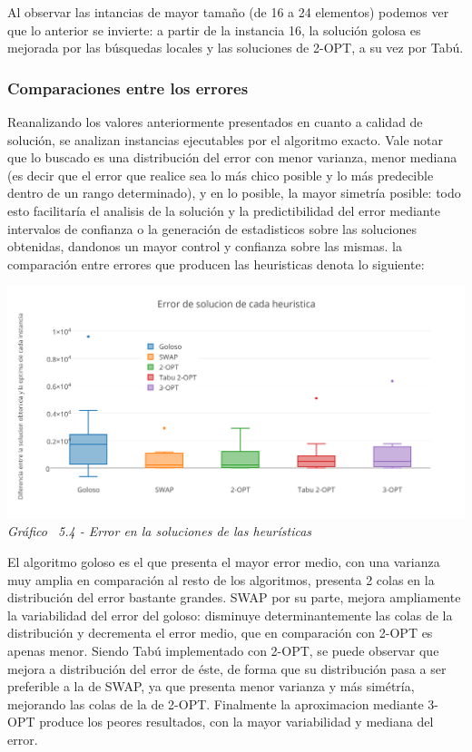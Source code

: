 Al observar las intancias de mayor tamaño (de 16 a 24 elementos) podemos ver que lo anterior se invierte: a partir de la instancia 16, la solución golosa es mejorada por las búsquedas locales y las soluciones de 2-OPT, a su vez por Tabú.

\subsubsection{Comparaciones entre los errores}

Reanalizando los valores anteriormente presentados en cuanto a calidad de solución, se analizan instancias ejecutables por el algoritmo exacto. Vale notar que lo buscado es una distribución del error con menor varianza, menor mediana (es decir que el error que realice sea lo más chico posible y lo más predecible dentro de un rango determinado), y en lo posible, la mayor simetría posible: todo esto facilitaría el analisis de la solución y la predictibilidad del error mediante intervalos de confianza o la generación de estadisticos sobre las soluciones obtenidas, dandonos un mayor control y confianza sobre las mismas. la comparación entre errores que producen las heuristicas denota lo siguiente:
	
	\vspace*{0.3cm} \vspace*{0.3cm}
  \begin{center}
 \includegraphics[scale=0.5]{./EJ5/errorporalgoritmo.png}\\
 {\textit{Gráfico \ 5.4 - Error en la soluciones de las heur\'isticas}}
  \end{center}
  \vspace*{0.3cm}
	
El algoritmo goloso es el que presenta el mayor error medio, con una varianza muy amplia en comparación al resto de los algoritmos, presenta 2 colas en la distribución del error bastante grandes. SWAP por su parte, mejora ampliamente la variabilidad del error del goloso: disminuye determinantemente las colas de la distribución y decrementa el error medio, que en comparación con 2-OPT es apenas menor. Siendo Tabú implementado con 2-OPT, se puede observar que mejora a distribución del error de éste, de forma que su distribución pasa a ser preferible a la de SWAP, ya que presenta menor varianza y más simétría, mejorando las colas de la de 2-OPT. Finalmente la aproximacion mediante 3-OPT produce los peores resultados, con la mayor variabilidad y mediana del error.



